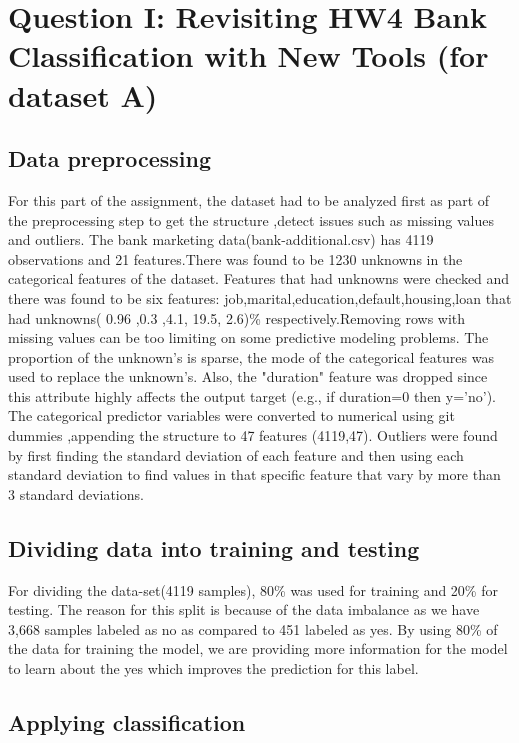 \section{Question I: Revisiting HW4 Bank Classification with New Tools (for dataset A)}
\subsection{Data preprocessing}
For this part of the assignment, the dataset had to be analyzed first as part of the preprocessing step to get the structure ,detect issues such as missing values and outliers. The bank marketing data(bank-additional.csv) has 4119 observations and 21 features.There was found to be 1230 unknowns in the categorical features of the dataset. Features that had unknowns were checked and there was found to be six features: job,marital,education,default,housing,loan that had unknowns( 0.96 ,0.3 ,4.1,  19.5, 2.6)\% respectively.Removing rows with missing values can be too limiting on some predictive modeling problems. The proportion of the unknown's is sparse, the mode of the categorical features was used to replace the unknown's. Also, the "duration" feature was dropped since this attribute highly affects the output target (e.g., if duration=0 then y='no').
The categorical predictor variables  were converted  to numerical using git dummies ,appending the structure to 47 features (4119,47).
Outliers were found by first finding the standard deviation of each feature and then using each standard deviation to find values in that specific feature that vary by more than 3 standard deviations. 

\subsection{Dividing data into training and testing}
For dividing the data-set(4119 samples), 80\% was used for training and 20\% for testing. The reason for this split is because of the data imbalance as we have  3,668 samples labeled as no as compared to 451 labeled as yes. By using 80\% of the data for training the model, we are providing more information for the model to learn about the yes which improves the prediction for this label. %


\subsection{Applying classification}

